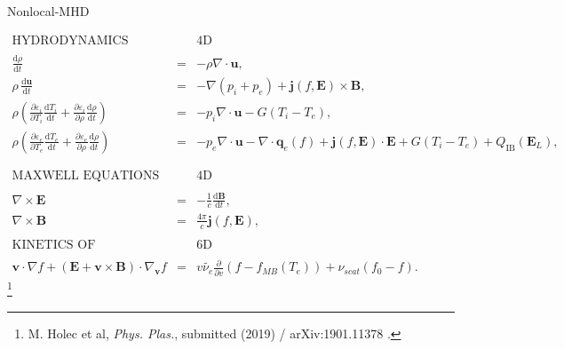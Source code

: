 \documentclass[8pt, compress]{beamer}
\newcommand{\vect}[1]{\boldsymbol{#1}}
\newcommand{\dI}{\text{d}}
\newcommand{\nue}{\nu_{e}}
\newcommand{\nuscat}{\nu_{scat}}
\newcommand{\E}{\vect{E}}
\newcommand{\fzero}{f_0}
\begin{document}
\begin{frame}
\begin{center}
{\huge Nonlocal-MHD}  

\begin{eqnarray}
  \text{HYDRODYNAMICS} && \text{4D} \nonumber \\
  && \nonumber \\
  \frac{\dI \rho}{\dI t} &=& - \rho\nabla\cdot\vect{u} , 
  \nonumber\\ 
  \rho\, \frac{\dI \vect{u}}{\dI t} &=& - \nabla (p_i + p_e) 
  + \vect{j}(f, \vect{E}) \times \vect{B}, 
  \nonumber\\   
  \rho \left(\frac{\partial \varepsilon_i}{\partial T_i}\frac{\dI T_i}{\dI t} 
  +\frac{\partial \varepsilon_i}{\partial \rho}\frac{\dI \rho}{\dI t}\right)
  &=& 
  - p_i\nabla\cdot\vect{u} - G(T_i - T_e) , 
  \nonumber\\
  \rho \left(\frac{\partial \varepsilon_e}{\partial T_e}\frac{\dI T_e}{\dI t}
  +\frac{\partial \varepsilon_e}{\partial \rho}\frac{\dI \rho}{\dI t}\right)
  &=& 
  - p_e \nabla\cdot\vect{u} - \nabla\cdot\vect{q}_e(f) 
  + \vect{j}(f, \E)\cdot\E
  + G(T_i - T_e) + Q_{\text{IB}}(\vect{E}_L) , 
  \nonumber \\
  && \nonumber \\
  && \nonumber \\
  \text{MAXWELL EQUATIONS} && \text{4D} \nonumber \\
  && \nonumber \\
  \nabla\times\vect{E} &=& -\frac{1}{c}\frac{\dI \vect{B}}{\dI t} ,
  \nonumber \\
  \nabla\times\vect{B} &=& \frac{4\pi}{c}
  \vect{j}(f, \vect{E}) ,%
  \nonumber \\
  && \nonumber \\
  \text{KINETICS OF ELECTRONS} && \text{6D} \nonumber \\
  && \nonumber \\
  \vect{v}\cdot\nabla f +
  \left( \vect{E} + \vect{v}\times\vect{B}\right)\cdot\nabla_{\vect{v}} f
  &=& 
  v \tilde{\nue} \frac{\partial }{\partial v}\left(f - f_{MB}(T_e)\right)
  + \nuscat \left(\fzero - f \right) .
  \nonumber
\end{eqnarray}
\let\thefootnote\relax\footnote{M. Holec et al, \textit{Phys. Plas.}, submitted (2019) / arXiv:1901.11378 .}
\end{center}
\end{frame}
\end{document}
